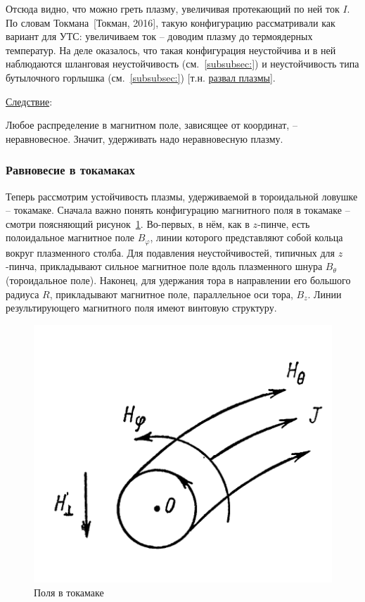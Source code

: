 \documentclass[10pt, a4paper]{article}
\newcommand{\Tokman}{~[Токман, 2016]}
\begin{document}
Отсюда видно, что можно греть плазму, увеличивая протекающий по ней ток $I$. По словам Токмана\Tokman, такую конфигурацию рассматривали как вариант для УТС: увеличиваем ток -- доводим плазму до термоядерных температур. На деле оказалось, что такая конфигурация неустойчива и в ней наблюдаются шланговая неустойчивость (см.~\ref{subsubsec:}) и неустойчивость типа бутылочного горлышка (см.~\ref{subsubsec:}) [т.н. \uline{развал плазмы}].

\uline{Следствие}:

Любое распределение в магнитном поле, зависящее от координат, -- неравновесное. Значит, удерживать надо неравновесную плазму.

\subsubsection{Равновесие в токамаках}

Теперь рассмотрим устойчивость плазмы, удерживаемой в тороидальной ловушке -- токамаке. Сначала важно понять конфигурацию магнитного поля в токамаке -- смотри поясняющий рисунок~\ref{fig:tokamak_fields}. Во-первых, в нём, как в $z$-пинче, есть полоидальное магнитное поле $B_\varphi$, линии которого представляют собой кольца вокруг плазменного столба. Для подавления неустойчивостей, типичных для $z$-пинча, прикладывают сильное магнитное поле вдоль плазменного шнура $B_\theta$ (тороидальное поле). Наконец, для удержания тора в направлении его большого радиуса $R$, прикладывают магнитное поле, параллельное оси тора, $B_z$. Линии результирующего магнитного поля имеют винтовую структуру.

\begin{figure}[ht]
	\begin{center}
		\includegraphics[width=0.5\linewidth]{6.tokamak_fields.png}
	\end{center}
    \caption{Поля в токамаке~\cite{arzimovich}}
    \label{fig:tokamak_fields} 
\end{figure}
\end{document}
